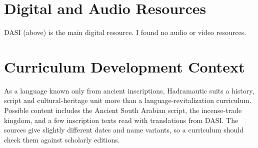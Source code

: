 \documentclass[12pt]{article}
\begin{document}
\section{Digital and Audio Resources}
DASI (above) is the main digital resource. I found no audio or video resources.

\section{Curriculum Development Context}
As a language known only from ancient inscriptions, Hadramautic suits a history, script and cultural-heritage unit more than a language-revitalization curriculum. Possible content includes the Ancient South Arabian script, the incense-trade kingdom, and a few inscription texts read with translations from DASI. The sources give slightly different dates and name variants, so a curriculum should check them against scholarly editions.
\end{document}
